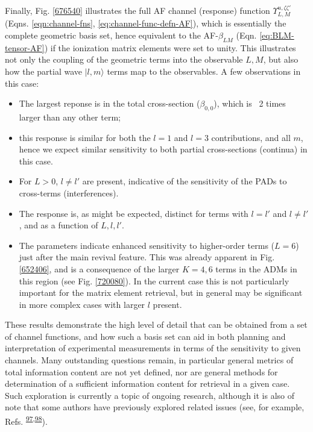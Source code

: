 \documentclass[10pt]{article}
\begin{document}
Finally, Fig. \ref{676540} illustrates the full AF channel (response) function $\varUpsilon_{L,M}^{u,\zeta\zeta'}$ (Eqns. \ref{eqn:channel-fns}, \ref{eq:channel-func-defn-AF}), which is essentially the complete geometric basis set,
hence equivalent to the AF-$\beta_{LM}$ (Eqn. \ref{eq:BLM-tensor-AF}) if the ionization matrix elements were set to unity. This illustrates not only the coupling of the geometric terms into the observable $L,M$, but also how the partial wave $|l,m\rangle$ terms map to the observables. %
A few observations in this case:

\begin{itemize}
\item The largest reponse is in the total cross-section ($\beta_{0,0}$), which is ~2 times larger than any other term; 
\item this response is similar for both the $l=1$ and $l=3$ contributions, and all $m$, hence we expect similar sensitivity to both partial cross-sections (continua) in this case.
\item For $L>0$, $l\neq l'$ are present, indicative of the sensitivity of the PADs to cross-terms (interferences).
\item The response is, as might be expected, distinct for terms with $l=l'$ and $l\neq l'$, and as a function of $L,l,l'$.
\item The parameters indicate enhanced sensitivity to higher-order terms ($L=6$) just after the main revival feature. This was already apparent in Fig. \ref{652406}, and is a consequence of the larger $K=4,6$ terms in the ADMs in this region (see Fig. \ref{720080}). In the current case this is not particularly important for the matrix element retrieval, but in general may be significant in more complex cases with larger $l$ present.

\end{itemize}

These results demonstrate the high level of detail that can be obtained from a set of channel functions, and how such a basis set can aid in both planning and interpretation of experimental measurements in terms of the sensitivity to given channels. Many outstanding questions remain, in particular general metrics of total information content are not yet defined, nor are general methods for determination of a sufficient information content for retrieval in a given case. Such exploration is currently a topic of ongoing research, although it is also of note that some authors have previously explored related issues (see, for example, Refs. \textsuperscript{\hyperref[csl:97]{97},\hyperref[csl:98]{98}}).
\end{document}
